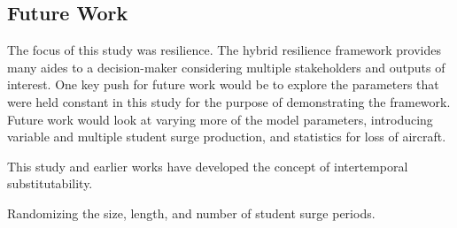 \documentclass[preprint,12pt]{elsarticle}
\begin{document}
\subsection{Future Work}

The focus of this study was resilience. The hybrid resilience
framework provides many aides to a decision-maker considering multiple
stakeholders and outputs of interest.
One key push for future work would be to explore the parameters that
were held constant in this study for the purpose of demonstrating the
framework. Future work would look at varying more of the model parameters,
introducing variable and multiple student surge production, and
statistics for loss of aircraft. 

% 
% 
% 
% 
This study and earlier works have developed the concept of
intertemporal substitutability. 

Randomizing the size, length, and number of student surge periods. 




\clearpage








\end{document}
